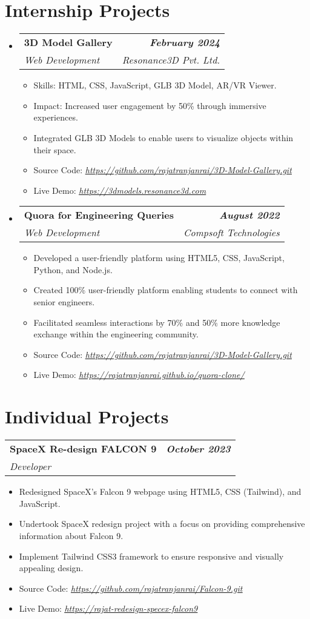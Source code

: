 \documentclass[letterpaper,11pt]{article}
\makeatletter
\newcommand{\resumeItem}[1]{
  \item\small{
    {#1 \vspace{-2pt}}
  }
}
\newcommand{\resumeSubheading}[4]{
  \vspace{-2pt}\item
    \begin{tabular*}{1.0\textwidth}[t]{l@{\extracolsep{\fill}}r}
      \textbf{#1} & \textbf{\small #2} \\
      \textit{\small#3} & \textit{\small #4} \\
    \end{tabular*}\vspace{-7pt}
}
\newcommand{\resumeSubHeadingListStart}{\begin{itemize}[leftmargin=0.0in, label={}]}
\newcommand{\resumeSubHeadingListEnd}{\end{itemize}}
\newcommand{\resumeItemListStart}{\begin{itemize}}
\newcommand{\resumeItemListEnd}{\end{itemize}\vspace{-5pt}}
\makeatother
\begin{document}
\section{Internship Projects}
\resumeSubHeadingListStart

\vspace{5pt}
\resumeSubheading
{3D Model Gallery}{\textit{February 2024}}
{Web Development}{Resonance3D Pvt. Ltd.}
\resumeItemListStart
    \resumeItem{Skills: HTML, CSS, JavaScript, GLB 3D Model, AR/VR Viewer.}
    \resumeItem{Impact: Increased user engagement by 50\% through immersive experiences.}
    \resumeItem{Integrated GLB 3D Models to enable users to visualize objects within their space.}
    \resumeItem{Source Code: \href{https://github.com/rajatranjanrai/3D-Model-Gallery.git}{\textit{\underline{https://github.com/rajatranjanrai/3D-Model-Gallery.git}}}}
    \resumeItem{Live Demo: \href{https://3dmodels.resonance3d.com}{\textit{\underline{https://3dmodels.resonance3d.com}}}}
\resumeItemListEnd

\vspace{5pt}
\resumeSubheading
{Quora for Engineering Queries}{\textit{August 2022}}
{Web Development}{Compsoft Technologies}
\resumeItemListStart
    \resumeItem{Developed a user-friendly platform using HTML5, CSS, JavaScript, Python, and Node.js.}
    \resumeItem{Created 100\% user-friendly platform enabling students to connect with senior engineers.}
    \resumeItem{Facilitated seamless interactions by 70\% and 50\% more knowledge exchange within the engineering community.}
    \resumeItem{Source Code: \href{https://github.com/rajatranjanrai/Clone-Quora-.git}{\textit{\underline{https://github.com/rajatranjanrai/3D-Model-Gallery.git}}}}
    \resumeItem{Live Demo: \href{https://rajatranjanrai.github.io/quora-clone/}{\textit{\underline{https://rajatranjanrai.github.io/quora-clone/}}}}
\resumeItemListEnd

\resumeSubHeadingListEnd
\vspace{-5pt}

\section{Individual Projects}
    \vspace{5pt}
    \resumeSubheading
          {SpaceX Re-design FALCON 9}{\textit{October 2023}}
          {Developer}{}
          \resumeItemListStart
            \resumeItem{Redesigned SpaceX's Falcon 9 webpage using HTML5, CSS (Tailwind), and JavaScript.}
            \resumeItem{Undertook SpaceX redesign project with a focus on providing comprehensive information about Falcon 9.}
            \resumeItem{Implement Tailwind CSS3 framework to ensure responsive and visually appealing design.}
            \resumeItem{Source Code: \href{https://github.com/rajatranjanrai/Falcon-9.git}{\textit{\underline{https://github.com/rajatranjanrai/Falcon-9.git}}}}
            \resumeItem{Live Demo: \href{https://rajatranjan-falcon-9.netlify.app}
            {\textit{\underline{https://rajat-redesign-specex-falcon9}}}}
          \resumeItemListEnd
    \vspace{5pt}
\end{document}
